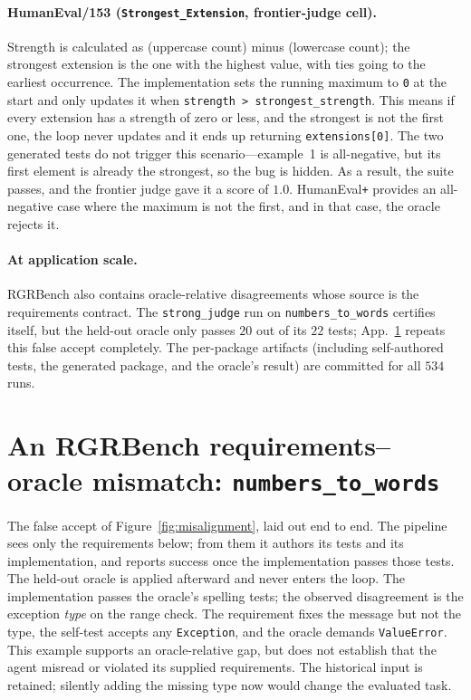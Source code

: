 \paragraph{HumanEval/153 (\texttt{Strongest\_Extension}, frontier-judge cell).} Strength is
calculated as (uppercase count) minus (lowercase count); the strongest extension is the one with
the highest value, with ties going to the earliest occurrence. The implementation sets the running
maximum to \texttt{0} at the start and only updates it when \texttt{strength > strongest\_strength}.
This means if every extension has a strength of zero or less, and the strongest is not the first
one, the loop never updates and it ends up returning \texttt{extensions[0]}. The two generated
tests do not trigger this scenario---example~1 is all-negative, but its first element is already
the strongest, so the bug is hidden. As a result, the suite passes, and the frontier judge gave it
a score of $1.0$. HumanEval\texttt{+} provides an all-negative case where the maximum is not the
first, and in that case, the oracle rejects it.

\paragraph{At application scale.} RGRBench also contains oracle-relative disagreements
whose source is the requirements contract. The
\texttt{strong\_judge} run on \texttt{numbers\_to\_words} certifies itself, but the held-out oracle
only passes $20$ out of its $22$ tests; App.~\ref{app:telephone} repeats this false accept
completely. The per-package artifacts (including self-authored tests, the generated package, and
the oracle's result) are committed for all $534$ runs.

\section{An RGRBench requirements--oracle mismatch: \texttt{numbers\_to\_words}}
\label{app:telephone}

The false accept of Figure~\ref{fig:misalignment}, laid out end to end. The pipeline sees only
the requirements below; from them it authors its tests and its implementation, and reports success
once the implementation passes those tests. The held-out oracle is applied afterward and never
enters the loop. The implementation passes the oracle's spelling tests; the observed disagreement is the
exception \emph{type} on the range check. The requirement fixes the message but not the
type, the self-test accepts any \texttt{Exception}, and the oracle demands
\texttt{ValueError}. This example supports an oracle-relative gap, but does not establish
that the agent misread or violated its supplied requirements. The historical input is
retained; silently adding the missing type now would change the evaluated task.

